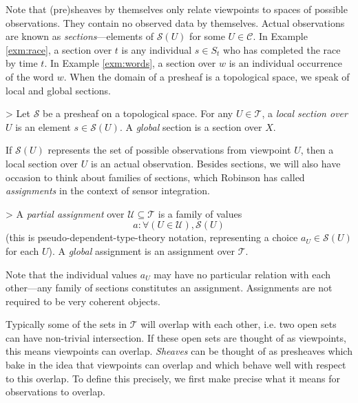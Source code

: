 Note that (pre)sheaves by themselves only relate viewpoints to spaces of possible observations. They contain no observed data by themselves. Actual observations are known as \emph{sections}---elements of $\mathcal{S}(U)$ for some $U \in \mathcal{C}$. In Example \ref{exm:race}, a section over $t$ is any individual $s \in S_t$ who has completed the race by time $t$. In Example \ref{exm:words}, a section over $w$ is an individual occurrence of the word $w$. When the domain of a presheaf is a topological space, we speak of local and global sections. %

\begin{definition}
>   Let $\mathcal{S}$ be a presheaf on a topological space. For any $U \in \mathcal{T}$, a \emph{local section over $U$} is an element $s \in \mathcal{S}(U)$. A \emph{global} section is a section over $X$.
\end{definition}

If $\mathcal{S}(U)$ represents the set of possible observations from viewpoint $U$, then a local section over $U$ is an actual observation. Besides sections, we will also have occasion to think about families of sections, which Robinson has called \emph{assignments} in the context of sensor integration.
\begin{definition}
>   A \emph{partial assignment} over $\mathcal{U} \subseteq \mathcal{T}$ is a family of values
\[ a : \forall (U \in \mathcal{U}), \mathcal{S}(U)\]
(this is pseudo-dependent-type-theory notation, representing a choice $a_U \in \mathcal{S}(U)$ for each $U$). A \emph{global} assignment is an assignment over $\mathcal{T}$.
\end{definition}
Note that the individual values $a_U$ may have no particular relation with each other---any family of sections constitutes an assignment. Assignments are not required to be very coherent objects.

Typically some of the sets in $\mathcal{T}$ will overlap with each other, i.e. two open sets can have non-trivial intersection. If these open sets are thought of as viewpoints, this means viewpoints can overlap. \emph{Sheaves} can be thought of as presheaves which bake in the idea that viewpoints can overlap and which behave well with respect to this overlap. To define this precisely, we first make precise what it means for observations to overlap.



